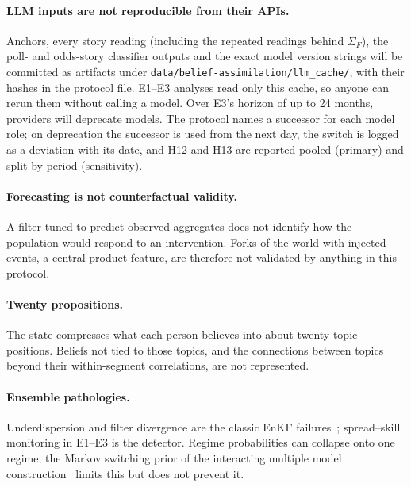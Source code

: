 \documentclass[10pt]{article}
\theoremstyle{remark}
\begin{document}
\paragraph{LLM inputs are not reproducible from their APIs.} Anchors, every story reading (including the repeated readings behind $\Sigma_F$), the poll- and odds-story classifier outputs and the exact model version strings will be committed as artifacts under \nolinkurl{data/belief-assimilation/llm_cache/}, with their hashes in the protocol file. E1--E3 analyses read only this cache, so anyone can rerun them without calling a model. Over E3's horizon of up to 24 months, providers will deprecate models. The protocol names a successor for each model role; on deprecation the successor is used from the next day, the switch is logged as a deviation with its date, and H12 and H13 are reported pooled (primary) and split by period (sensitivity).

\paragraph{Forecasting is not counterfactual validity.} A filter tuned to predict observed aggregates does not identify how the population would respond to an intervention. Forks of the world with injected events, a central product feature, are therefore not validated by anything in this protocol.

\paragraph{Twenty propositions.} The state compresses what each person believes into about twenty topic positions. Beliefs not tied to those topics, and the connections between topics beyond their within-segment correlations, are not represented.

\paragraph{Ensemble pathologies.} Underdispersion and filter divergence are the classic EnKF failures~\cite{houtekamer2016}; spread--skill monitoring in E1--E3 is the detector. Regime probabilities can collapse onto one regime; the Markov switching prior of the interacting multiple model construction~\cite{blom1988} limits this but does not prevent it.
\end{document}
